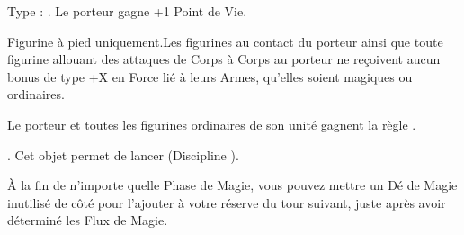 \endpricelist

\armymagicalarmour

\startpricelist

 Type : \platearmour{}. Le porteur gagne +1 Point de Vie.

\endpricelist

\armytalismans

\startpricelist

 

 Figurine à pied uniquement.\newline Les figurines au contact du porteur ainsi que toute figurine allouant des attaques de Corps à Corps au porteur ne reçoivent aucun bonus de type +X en Force lié à leurs Armes, qu'elles soient magiques ou ordinaires.

\endpricelist

\armyenchanteditems

\startpricelist

 Le porteur et toutes les figurines ordinaires de son unité gagnent la règle \distracting{}.

\endpricelist

\armyarcaneitems

\startpricelist

 

 . Cet objet permet de lancer \necromancyspelltwo{} (Discipline \necromancy{}).


 À la fin de n'importe quelle Phase de Magie, vous pouvez mettre un Dé de Magie inutilisé de côté pour l'ajouter à votre réserve du tour suivant, juste après avoir déterminé les Flux de Magie.

